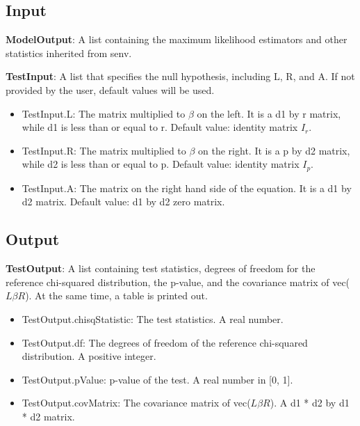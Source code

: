 \documentclass[a4paper,11pt,openany]{memoir}
\begin{document}
\subsection*{Input}

\begin{par}
\textbf{ModelOutput}: A list containing the maximum likelihood estimators and other statistics inherited from senv.
\end{par} \vspace{1em}
\begin{par}
\textbf{TestInput}: A list that specifies the null hypothesis, including L, R, and A.  If not provided by the user, default values will be used.
\end{par} \vspace{1em}
\begin{itemize}
\setlength{\itemsep}{-1ex}
   \item TestInput.L: The matrix multiplied to $\beta$ on the left.  It is a d1 by r matrix, while d1 is less than or equal to r.  Default value: identity matrix $I_r$.
   \item TestInput.R: The matrix multiplied to $\beta$ on the right.  It is a p by d2 matrix, while d2 is less than or equal to p.  Default value: identity matrix $I_p$.
   \item TestInput.A: The matrix on the right hand side of the equation.  It is a d1 by d2 matrix.  Default value: d1 by d2 zero matrix.
\end{itemize}


\subsection*{Output}

\begin{par}
\textbf{TestOutput}: A list containing test statistics, degrees of freedom for the reference chi-squared distribution, the p-value, and the covariance matrix of vec($L\beta R$).  At the same time, a table is printed out.
\end{par} \vspace{1em}
\begin{itemize}
\setlength{\itemsep}{-1ex}
   \item TestOutput.chisqStatistic: The test statistics. A real number.
   \item TestOutput.df: The degrees of freedom of the reference chi-squared distribution.  A positive integer.
   \item TestOutput.pValue: p-value of the test.  A real number in [0, 1].
   \item TestOutput.covMatrix: The covariance matrix of vec($L\beta R$). A d1 * d2 by d1 * d2 matrix.
\end{itemize}
\end{document}
